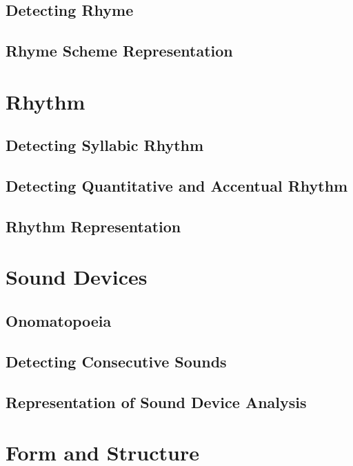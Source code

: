 \subsection{Detecting Rhyme}

\subsection{Rhyme Scheme Representation}



\section{Rhythm}

\subsection{Detecting Syllabic Rhythm}

\subsection{Detecting Quantitative and Accentual Rhythm}

\subsection{Rhythm Representation}



\section{Sound Devices}

\subsection{Onomatopoeia}

\subsection{Detecting Consecutive Sounds}

\subsection{Representation of Sound Device Analysis}



\section{Form and Structure}


